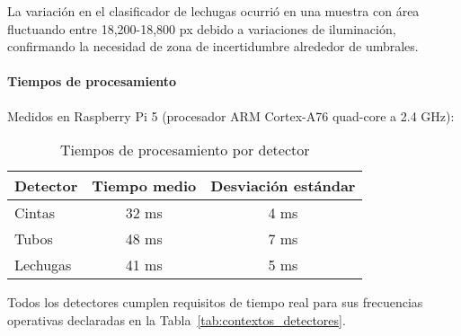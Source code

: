 \begin{enumerate}
\noindent
La variación en el clasificador de lechugas ocurrió en una muestra con área fluctuando entre 18,200-18,800 px debido a variaciones de iluminación, confirmando la necesidad de zona de incertidumbre alrededor de umbrales.

\paragraph{Tiempos de procesamiento}
Medidos en Raspberry Pi 5 (procesador ARM Cortex-A76 quad-core a 2.4 GHz):

\begin{table}[H]
\centering
\begin{tabular}{|l|c|c|}
\hline
\textbf{Detector} & \textbf{Tiempo medio} & \textbf{Desviación estándar} \\ \hline
Cintas & 32 ms & 4 ms \\ \hline
Tubos & 48 ms & 7 ms \\ \hline
Lechugas & 41 ms & 5 ms \\ \hline
\end{tabular}
\caption{Tiempos de procesamiento por detector}
\label{tab:tiempos_procesamiento}
\end{table}

\noindent
Todos los detectores cumplen requisitos de tiempo real para sus frecuencias operativas declaradas en la Tabla~\ref{tab:contextos_detectores}.

\end{enumerate}